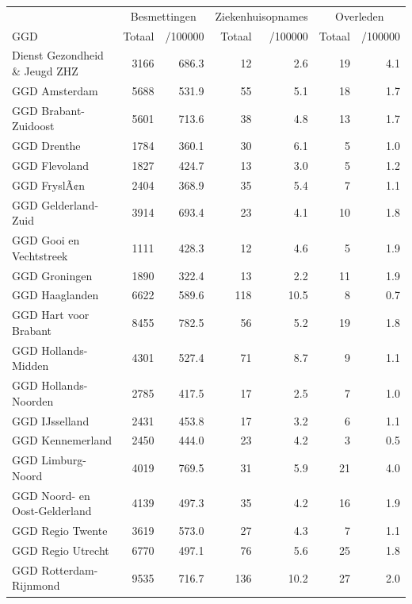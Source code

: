 \documentclass[
  english,
  man,floatsintext]{apa6}
\begin{document}
\begin{table}
\centering\begingroup\fontsize{10}{12}\selectfont

\begin{threeparttable}
\begin{tabular}{lrrrrrr}
\toprule
\multicolumn{1}{c}{ } & \multicolumn{2}{c}{Besmettingen} & \multicolumn{2}{c}{Ziekenhuisopnames} & \multicolumn{2}{c}{Overleden} \\
\cmidrule(l{3pt}r{3pt}){2-3} \cmidrule(l{3pt}r{3pt}){4-5} \cmidrule(l{3pt}r{3pt}){6-7}
GGD & Totaal & /100000 & Totaal & /100000 & Totaal & /100000\\
\midrule
Dienst Gezondheid \& Jeugd ZHZ & 3166 & 686.3 & 12 & 2.6 & 19 & 4.1\\
GGD Amsterdam & 5688 & 531.9 & 55 & 5.1 & 18 & 1.7\\
GGD Brabant-Zuidoost & 5601 & 713.6 & 38 & 4.8 & 13 & 1.7\\
GGD Drenthe & 1784 & 360.1 & 30 & 6.1 & 5 & 1.0\\
GGD Flevoland & 1827 & 424.7 & 13 & 3.0 & 5 & 1.2\\
GGD FryslÃ¢n & 2404 & 368.9 & 35 & 5.4 & 7 & 1.1\\
GGD Gelderland-Zuid & 3914 & 693.4 & 23 & 4.1 & 10 & 1.8\\
GGD Gooi en Vechtstreek & 1111 & 428.3 & 12 & 4.6 & 5 & 1.9\\
GGD Groningen & 1890 & 322.4 & 13 & 2.2 & 11 & 1.9\\
GGD Haaglanden & 6622 & 589.6 & 118 & 10.5 & 8 & 0.7\\
GGD Hart voor Brabant & 8455 & 782.5 & 56 & 5.2 & 19 & 1.8\\
GGD Hollands-Midden & 4301 & 527.4 & 71 & 8.7 & 9 & 1.1\\
GGD Hollands-Noorden & 2785 & 417.5 & 17 & 2.5 & 7 & 1.0\\
GGD IJsselland & 2431 & 453.8 & 17 & 3.2 & 6 & 1.1\\
GGD Kennemerland & 2450 & 444.0 & 23 & 4.2 & 3 & 0.5\\
GGD Limburg-Noord & 4019 & 769.5 & 31 & 5.9 & 21 & 4.0\\
GGD Noord- en Oost-Gelderland & 4139 & 497.3 & 35 & 4.2 & 16 & 1.9\\
GGD Regio Twente & 3619 & 573.0 & 27 & 4.3 & 7 & 1.1\\
GGD Regio Utrecht & 6770 & 497.1 & 76 & 5.6 & 25 & 1.8\\
GGD Rotterdam-Rijnmond & 9535 & 716.7 & 136 & 10.2 & 27 & 2.0\\

\end{tabular}
\end{threeparttable}
\end{table}
\end{document}
